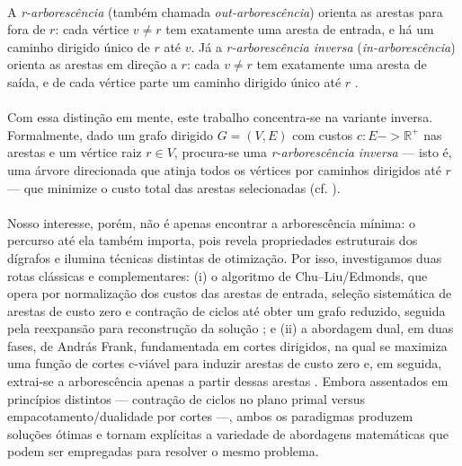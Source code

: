 \documentclass[12pt,a4paper]{article}
\def\to{->}%
\begin{document}
\paragraph{}
A \textit{r-arborescência} (também chamada \textit{out-arborescência}) orienta as arestas para fora de \(r\): cada vértice \(v\neq r\) tem exatamente uma aresta de entrada, e há um caminho dirigido único de \(r\) até \(v\). Já a \textit{r-arborescência inversa} (\textit{in-arborescência}) orienta as arestas em direção a \(r\): cada \(v\neq r\) tem exatamente uma aresta de saída, e de cada vértice parte um caminho dirigido único até \(r\) \cite{edmonds1967optimum,frank2014}.

\paragraph{}
Com essa distinção em mente, este trabalho concentra-se na variante inversa. Formalmente, dado um grafo dirigido \(G=(V,E)\) com custos \(c:E\to\mathbb{R}^+\) nas arestas e um vértice raiz \(r\in V\), procura-se uma \textit{r-arborescência inversa} — isto é, uma árvore direcionada que atinja todos os vértices por caminhos dirigidos até \(r\) — que minimize o custo total das arestas selecionadas (cf. \cite{edmonds1967optimum,frank2014}).

\paragraph{}
Nosso interesse, porém, não é apenas encontrar a arborescência mínima: o percurso até ela também importa, pois revela propriedades estruturais dos dígrafos e ilumina técnicas distintas de otimização. Por isso, investigamos duas rotas clássicas e complementares: (i) o algoritmo de Chu--Liu/Edmonds, que opera por normalização dos custos das arestas de entrada, seleção sistemática de arestas de custo zero e contração de ciclos até obter um grafo reduzido, seguida pela reexpansão para reconstrução da solução \cite{chu1965,edmonds1967optimum}; e (ii) a abordagem dual, em duas fases, de András Frank, fundamentada em cortes dirigidos, na qual se maximiza uma função de cortes c-viável para induzir arestas de custo zero e, em seguida, extrai-se a arborescência apenas a partir dessas arestas \cite{frank2014}. Embora assentados em princípios distintos — contração de ciclos no plano primal versus empacotamento/dualidade por cortes —, ambos os paradigmas produzem soluções ótimas e tornam explícitas a variedade de abordagens matemáticas que podem ser empregadas para resolver o mesmo problema.
\end{document}
